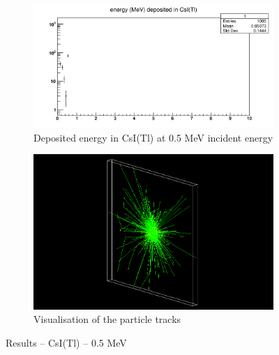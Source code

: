 \documentclass{article}
\begin{document}
\begin{figure}[H]
\centering
\begin{subfigure}{.5\textwidth}
  \centering
  \includegraphics[width=\linewidth]{images/task1/CsI_05MeV.png}
  \caption{Deposited energy in CsI(Tl) at 0.5 MeV incident energy}
\end{subfigure}%
\begin{subfigure}{.5\textwidth}
  \centering
  \includegraphics[width=\linewidth]{images/task1/CsI_05MeV_1000.png}
  \caption{Visualisation of the particle tracks}
\end{subfigure}
\caption{Results – CsI(Tl) – 0.5 MeV}
\end{figure}
\end{document}
